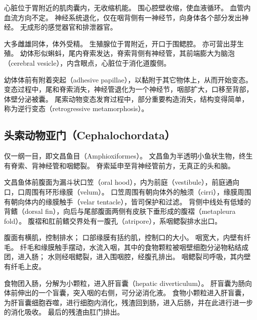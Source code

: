 \documentclass[11pt]{article}
\begin{document}
\newline

心脏位于胃附近的肌肉囊内，无收缩机能。
围心腔壁收缩，使血液循环。
血管内血流方向不定。
神经系统退化，仅在咽背侧有一神经节，向身体各个部分发出神经。
无成形的感觉器官和排泄器官。

\newline

大多雌雄同体，体外受精。
生殖腺位于胃附近，开口于围鳃腔。
亦可营出芽生殖。
幼体形似蝌蚪，尾内脊索发达，脊索背侧有神经管，其前端膨大为脑泡（cerebral vesicle），内含眼点，心脏位于消化道腹侧。

\newline

幼体体前有附着突起（adhesive papillae），以黏附于其它物体上，从而开始变态。
变态过程中，尾和脊索消失，神经管退化为一个神经节，咽部扩大，口移至背部，体壁分泌被囊。
尾索动物变态发育过程中，部分重要构造消失，结构变得简单，称为逆行变态（retrogressive metamorphosis）。
  
\subsection{头索动物亚门（Cephalochordata）}
仅一纲一目，即文昌鱼目（Amphioxiformes）。
文昌鱼为半透明小鱼状生物，终生有脊索、背神经管和咽鳃裂。
脊索延申至背神经管前方，无真正的头和脑。

\newline

文昌鱼体前腹面为漏斗状口笠（oral hood），内为前庭（vestibule），前庭通向口，口周围有环形缘膜（velum）。
口笠周围有朝向体外的触须（cirri），缘膜周围有朝向体内的缘膜触手（velar tentacle），皆司保护和过滤。
背侧中线处有低矮的背鳍（dorsal fin），向后与尾部腹面两侧有皮肤下垂形成的腹褶（metapleura fold）。
腹褶和肛前鳍交界处有一腹孔（atripore），系咽鳃裂排水出口。

\newline

腹面有横肌，控制排水；
口部缘膜有括约肌，控制口的大小。
咽宽大，内壁有纤毛。
纤毛和缘膜触手摆动，水流入咽，其中的食物颗粒被咽壁细胞分泌物粘结成团，进入肠；
水则经咽鳃裂，进入围咽腔，经腹孔排出。
咽鳃裂司呼吸，其内壁有纤毛上皮。

\newline

食物团入肠，分解为小颗粒，进入肝盲囊（hepatic diverticulum）。
肝盲囊为肠向体前伸出的一个盲囊，突入咽的右侧，可分泌消化液。
食物小颗粒进入肝盲囊，为肝盲囊细胞吞噬，进行细胞内消化，残渣回到肠，进入后肠，并在此进行进一步的消化吸收。
最后的残渣由肛门排出。
\end{document}
